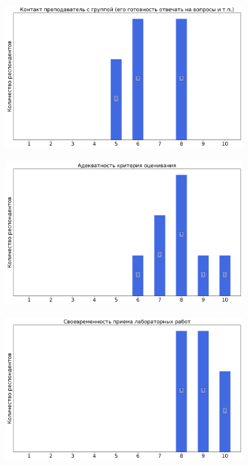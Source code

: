         \begin{figure}[H]
            \centering
            \begin{subfigure}[b]{0.45\textwidth}
                \centering
                \includegraphics[width=\textwidth]{images/1 course/Общая физика - механика/labniks-marks-Удалова А.Г.-0.png}
            \end{subfigure}
            \begin{subfigure}[b]{0.45\textwidth}
                \centering
                \includegraphics[width=\textwidth]{images/1 course/Общая физика - механика/labniks-marks-Удалова А.Г.-1.png}
            \end{subfigure}
            \begin{subfigure}[b]{0.45\textwidth}
                \centering
                \includegraphics[width=\textwidth]{images/1 course/Общая физика - механика/labniks-marks-Удалова А.Г.-2.png}

\end{subfigure}
\end{figure}

